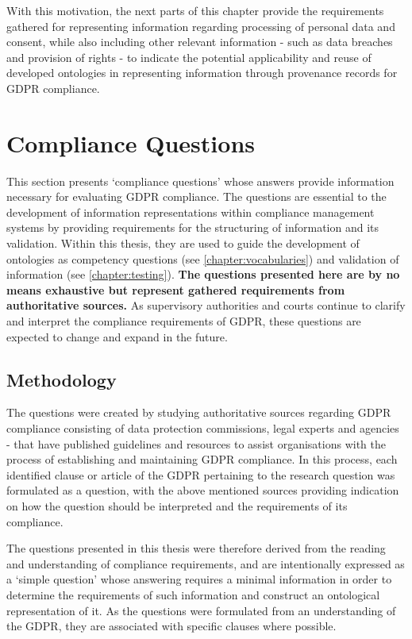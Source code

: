 With this motivation, the next parts of this chapter provide the requirements gathered for representing information regarding processing of personal data and consent, while also including other relevant information - such as data breaches and provision of rights - to indicate the potential applicability and reuse of developed ontologies in representing information through provenance records for GDPR compliance.

\color{black}
\section{Compliance Questions}\label{sec:info:compliance-questions}
This section presents `compliance questions' whose answers provide information necessary for evaluating GDPR compliance. The questions are essential to the development of information representations within compliance management systems by providing requirements for the structuring of information and its validation. Within this thesis, they are used to guide the development of ontologies as competency questions (see \autoref{chapter:vocabularies}) and validation of information (see \autoref{chapter:testing}). \textbf{The questions presented here are by no means exhaustive but represent gathered requirements from authoritative sources.} As supervisory authorities and courts continue to clarify and interpret the compliance requirements of GDPR, these questions are expected to change and expand in the future.

\subsection{Methodology}\label{sec:info:compliance-questions-methodology}
The questions were created by studying authoritative sources regarding GDPR compliance  consisting of data protection commissions, legal experts and agencies - that have published guidelines and resources to assist organisations with the process of establishing and maintaining GDPR compliance.
In this process, each identified clause or article of the GDPR pertaining to the research question was formulated as a question, with the above mentioned sources providing indication on how the question should be interpreted and the requirements of its compliance.

The questions presented in this thesis were therefore derived from the reading and understanding of compliance requirements, and are intentionally expressed as a `simple question' whose answering requires a minimal information in order to determine the requirements of such information and construct an ontological representation of it.
As the questions were formulated from an understanding of the GDPR, they are associated with specific clauses where possible.

